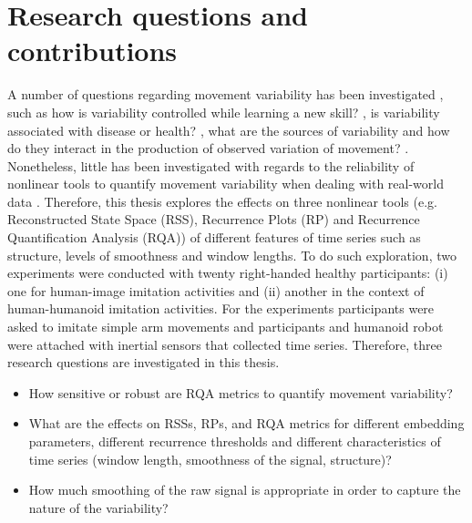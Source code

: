 \section{Research questions and contributions}

A number of questions regarding movement variability has been investigated
\citep{stergiou2006, stergiou2011}, such as how is variability controlled 
while learning a new skill? \citep{wagner2012, seifert2011, bartlett2007}, 
is variability associated with disease or health? 
\citep{stergiou2006, stergiou2011}, what are the sources of variability 
and how do they interact in the production of observed variation 
of movement? \citep{preatoni2007, preatoni2010, preatoni2013}.
Nonetheless, little has been investigated with regards to the reliability of 
nonlinear tools to quantify movement variability \citep{iwanski1998, yao2017}
when dealing with real-world data \citep{bradley2015, caballero2014}.
Therefore, this thesis explores the effects on three nonlinear tools
(e.g. Reconstructed State Space (RSS), Recurrence Plots (RP) and 
Recurrence Quantification Analysis (RQA)) of  different features 
of time series such as structure, levels of smoothness and window lengths.
To do such exploration, two experiments were conducted with twenty 
right-handed healthy participants: (i) one for human-image imitation 
activities and (ii) another in the context of human-humanoid imitation activities.
For the experiments participants were asked to imitate simple arm movements
and participants and humanoid robot were attached with inertial sensors 
that collected time series.
Therefore, three research questions are investigated in this thesis.

\begin{itemize}

\item How sensitive or robust are RQA metrics to quantify movement 
	variability?

\item What are the effects on RSSs, RPs, and RQA metrics
	for different embedding parameters, different recurrence thresholds 
	and different characteristics of time series (window length, 
	smoothness of the signal, structure)?

\item How much smoothing of the raw signal is appropriate in order to 
	capture the nature of the variability?

\end{itemize}




